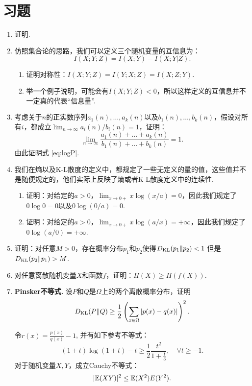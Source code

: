 \section{习题}
\begin{enumerate}[wide, labelindent=0pt]
    \item \label{exercise:conditional-mutual-information} 证明. 
    
    \item 仿照集合论的思路，我们可以定义三个随机变量的互信息为：
    \[I(X;Y;Z)=I(X;Y)-I(X;Y|Z).\]
    \begin{enumerate}
        \item 证明对称性：$I(X;Y;Z)=I(Y;X;Z) = I(X;Z;Y)$.
        \item 举一个例子说明，可能会有$I(X;Y;Z)<0$，所以这样定义的互信息并不一定真的代表“信息量”.
    \end{enumerate}

    \item 考虑关于$n$的正实数序列$a_1(n),\dots,a_k(n)$以及$b_1(n),\dots,b_k(n)$，假设对所有$i$，都成立$\lim_{n\to\infty} a_i(n)/b_i(n)=1$，证明：
    \[\lim_{n\to\infty}\frac{a_1(n)+\dots+a_k(n)}{b_1(n)+\dots+b_k(n)}=1.\]
    由此证明式 \eqref{eq:logP}.

    \item 我们在熵以及K-L散度的定义中，都规定了一些无定义的量的值，这些值并不是随便规定的，他们实际上反映了熵或者K-L散度定义中的连续性.
    \begin{enumerate}
        \item 证明：对给定的$a>0$，$\lim_{x\to 0+}x\log (x/a)=0$，因此我们规定了$0\log 0=0$以及$0\log(0/a)=0$.
        \item 证明：对给定的$a>0$，$\lim_{x\to 0+}x\log (a/x)=+\infty$，因此我们规定了$0\log(a/0)=+\infty$.
    \end{enumerate}
    
    
    \item \label{exercise:kl-divergence-asymmetry} 证明：对任意$M>0$，存在概率分布$p_1$和$p_2$使得$D_{\mathrm{KL}}(p_{1}\Vert p_{2})<1$ 但是 $D_{\mathrm{KL}}(p_{2}\Vert p_{1})>M$.
    
    \item 对任意离散随机变量$X$和函数$f$，证明：$H(X)\geq H(f(X))$.
    
    \item \textbf{Pinsker不等式. }设$P$和$Q$是$\Omega$上的两个离散概率分布，证明
    \[
        D_{\mathrm{KL}}(P\Vert Q) \geq \frac{1}{2} \left(\sum_{x\in \Omega} |p(x) - q(x)|\right)^2.
    \]
    \begin{hint}
        令$r(x) = \frac{p(x)}{q(x)} - 1$, 并有如下参考不等式：
        \[
            (1+t) \log (1+t) - t \geqslant \frac{1}{2} \frac{t^2}{1+\frac{t}{3}}, \quad \forall t \geqslant -1.
        \]
        对于随机变量$X,Y$，成立Cauchy不等式：
        \[
            |\mathbb{E}(XY)|^2 \leq \mathbb{E}(X^2)E(Y^2).
        \]
    \end{hint}


\end{enumerate}
